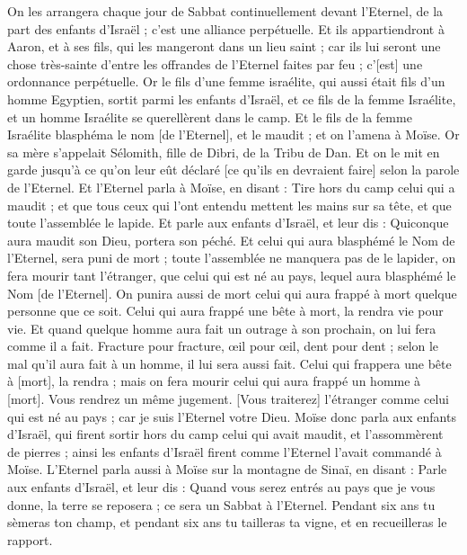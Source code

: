 \begin{multicols}{2}
On les arrangera chaque jour de Sabbat continuellement devant l'Eternel, de la part des enfants d'Israël ; c'est une alliance perpétuelle.
Et ils appartiendront à Aaron, et à ses fils, qui les mangeront dans un lieu saint ; car ils lui seront une chose très-sainte d'entre les offrandes de l'Eternel faites par feu ; c'[est] une ordonnance perpétuelle.
Or le fils d'une femme israélite, qui aussi était fils d'un homme Egyptien, sortit parmi les enfants d'Israël, et ce fils de la femme Israélite, et un homme Israélite se querellèrent dans le camp.
Et le fils de la femme Israélite blasphéma le nom [de l'Eternel], et le maudit ; et on l'amena à Moïse. Or sa mère s'appelait Sélomith, fille de Dibri, de la Tribu de Dan.
Et on le mit en garde jusqu'à ce qu'on leur eût déclaré [ce qu'ils en devraient faire] selon la parole de l'Eternel.
Et l'Eternel parla à Moïse, en disant :
Tire hors du camp celui qui a maudit ; et que tous ceux qui l'ont entendu mettent les mains sur sa tête, et que toute l'assemblée le lapide.
Et parle aux enfants d'Israël, et leur dis : Quiconque aura maudit son Dieu, portera son péché.
Et celui qui aura blasphémé le Nom de l'Eternel, sera puni de mort ; toute l'assemblée ne manquera pas de le lapider, on fera mourir tant l'étranger, que celui qui est né au pays, lequel aura blasphémé le Nom [de l'Eternel].
On punira aussi de mort celui qui aura frappé à mort quelque personne que ce soit.
Celui qui aura frappé une bête à mort, la rendra vie pour vie.
Et quand quelque homme aura fait un outrage à son prochain, on lui fera comme il a fait.
Fracture pour fracture, œil pour œil, dent pour dent ; selon le mal qu'il aura fait à un homme, il lui sera aussi fait.
Celui qui frappera une bête à [mort], la rendra ; mais on fera mourir celui qui aura frappé un homme à [mort].
Vous rendrez un même jugement. [Vous traiterez] l'étranger comme celui qui est né au pays ; car je suis l'Eternel votre Dieu.
Moïse donc parla aux enfants d'Israël, qui firent sortir hors du camp celui qui avait maudit, et l'assommèrent de pierres ; ainsi les enfants d'Israël firent comme l'Eternel l'avait commandé à Moïse.
\VerseOne{}L'Eternel parla aussi à Moïse sur la montagne de Sinaï, en disant :
Parle aux enfants d'Israël, et leur dis : Quand vous serez entrés au pays que je vous donne, la terre se reposera ; ce sera un Sabbat à l'Eternel.
Pendant six ans tu sèmeras ton champ, et pendant six ans tu tailleras ta vigne, et en recueilleras le rapport.

\end{multicols}
